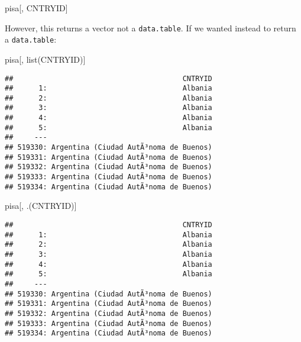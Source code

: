 \documentclass[
]{book}
\newenvironment{Shaded}{\begin{snugshade}}{\end{snugshade}}
\newcommand{\FunctionTok}[1]{\textcolor[rgb]{0.00,0.00,0.00}{#1}}
\newcommand{\NormalTok}[1]{#1}
\begin{document}
\begin{Shaded}
\begin{Highlighting}[]
\NormalTok{pisa[,}
\NormalTok{     CNTRYID]}
\end{Highlighting}
\end{Shaded}

However, this returns a vector not a \texttt{data.table}. If we wanted instead to return a \texttt{data.table}:

\begin{Shaded}
\begin{Highlighting}[]
\NormalTok{pisa[, }
     \FunctionTok{list}\NormalTok{(CNTRYID)]}
\end{Highlighting}
\end{Shaded}

\begin{verbatim}
##                                        CNTRYID
##      1:                                Albania
##      2:                                Albania
##      3:                                Albania
##      4:                                Albania
##      5:                                Albania
##     ---                                       
## 519330: Argentina (Ciudad AutÃ³noma de Buenos)
## 519331: Argentina (Ciudad AutÃ³noma de Buenos)
## 519332: Argentina (Ciudad AutÃ³noma de Buenos)
## 519333: Argentina (Ciudad AutÃ³noma de Buenos)
## 519334: Argentina (Ciudad AutÃ³noma de Buenos)
\end{verbatim}

\begin{Shaded}
\begin{Highlighting}[]
\NormalTok{pisa[,}
\NormalTok{     .(CNTRYID)]}
\end{Highlighting}
\end{Shaded}

\begin{verbatim}
##                                        CNTRYID
##      1:                                Albania
##      2:                                Albania
##      3:                                Albania
##      4:                                Albania
##      5:                                Albania
##     ---                                       
## 519330: Argentina (Ciudad AutÃ³noma de Buenos)
## 519331: Argentina (Ciudad AutÃ³noma de Buenos)
## 519332: Argentina (Ciudad AutÃ³noma de Buenos)
## 519333: Argentina (Ciudad AutÃ³noma de Buenos)
## 519334: Argentina (Ciudad AutÃ³noma de Buenos)
\end{verbatim}
\end{document}

